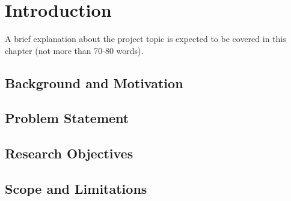 \chapter{Introduction}
A brief explanation about the project topic is expected to be covered in this chapter (not more than 70-80 words).
	
\section{Background and Motivation}



\section{Problem Statement}



\section{Research Objectives}



\section{Scope and Limitations}